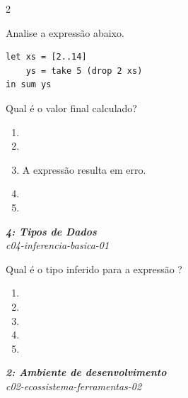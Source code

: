 \documentclass[a4paper,10pt,brazil]{article}
\begin{document}
\begin{multicols}{2}
\begin{flushright}
\end{flushright}
Analise a expressão abaixo.
\begin{verbatim}
let xs = [2..14]
    ys = take 5 (drop 2 xs)
in sum ys
\end{verbatim}
Qual é o valor final calculado?

\begin{enumerate}
  \item {}

  \item {}

  \item A expressão resulta em erro.

  \item {}

  \item {}


\end{enumerate}

\begin{flushright}
  \footnotesize
  \textit{\textbf{4: Tipos de Dados}}\\
  \textit{c04-inferencia-basica-01}\\

\end{flushright}
Qual é o tipo inferido para a expressão ?

\begin{enumerate}
  \item {}

  \item {}

  \item {}

  \item {}

  \item {}


\end{enumerate}

\begin{flushright}
  \footnotesize
  \textit{\textbf{2: Ambiente de desenvolvimento}}\\
  \textit{c02-ecossistema-ferramentas-02}\\


\end{flushright}
\end{multicols}
\end{document}
